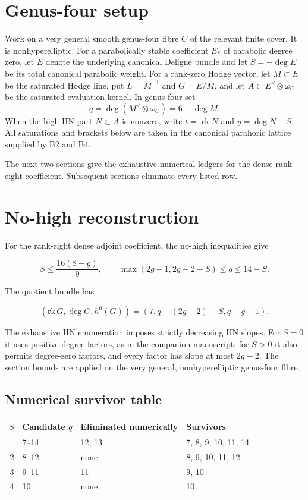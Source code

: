 \documentclass[11pt]{article}
\theoremstyle{definition}
\newcommand{\rk}{\operatorname{rk}}
\begin{document}
\section{Genus-four setup}\label{sec:setup}

Work on a very general smooth genus-four fibre $C$ of the relevant finite
cover.  It is nonhyperelliptic.  For a parabolically stable coefficient
$E_*$ of parabolic degree zero, let $E$ denote the underlying canonical
Deligne bundle and let $S=-\deg E$ be its total canonical parabolic weight.
For a rank-zero Hodge vector, let $M\subset E$ be the saturated Hodge line,
put $L=M^{-1}$ and $G=E/M$, and let $A\subset E^\vee\otimes\omega_C$ be the
saturated evaluation kernel.  In genus four set
\[
 q=\deg(M^\vee\otimes\omega_C)=6-\deg M.
\]
When the high-HN part $N\subset A$ is nonzero, write
$t=\rk N$ and $y=\deg N-S$.  All saturations and brackets below are taken in
the canonical parahoric lattice supplied by B2 and B4.

The next two sections give the exhaustive numerical ledgers for the dense
rank-eight coefficient.  Subsequent sections eliminate every listed row.

\section{No-high reconstruction}\label{no-high-reconstruction}

For the rank-eight dense adjoint coefficient, the no-high inequalities
give

\[S\le \frac{16(8-g)}9,
\qquad
\max(2g-1,2g-2+S)\le q\le14-S.\]

The quotient bundle has

\[(\mathrm{rk}\,G,\deg G,h^0(G))
=(7,q-(2g-2)-S,q-g+1).\]

The exhaustive HN enumeration imposes strictly decreasing HN slopes. For
\(S=0\) it uses positive-degree factors, as in the companion manuscript;
for \(S>0\) it also
permits degree-zero factors, and every factor has slope at most
\(2g-2\). The section bounds are applied on the very general,
nonhyperelliptic genus-four fibre.

\subsection{Numerical survivor table}\label{genus-four}

\begin{longtable}[]{@{}rlll@{}}
\toprule\noalign{}
\(S\) & Candidate \(q\) & Eliminated numerically & Survivors \\
\midrule\noalign{}
\endhead
\bottomrule\noalign{}
\endlastfoot
0 & 7--14 & 12, 13 & 7, 8, 9, 10, 11, 14 \\
2 & 8--12 & none & 8, 9, 10, 11, 12 \\
3 & 9--11 & 11 & 9, 10 \\
4 & 10 & none & 10 \\
\end{longtable}
\end{document}
